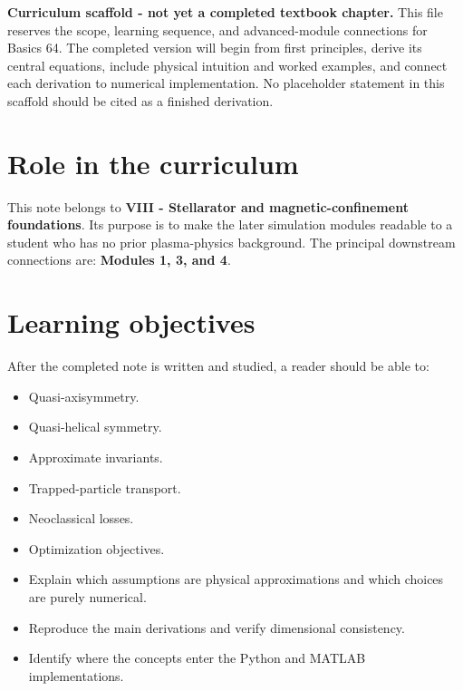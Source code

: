 \documentclass[11pt]{article}
\begin{document}

\begin{overviewbox}
\textbf{Curriculum scaffold - not yet a completed textbook chapter.} This file reserves the scope, learning sequence, and advanced-module connections for Basics 64. The completed version will begin from first principles, derive its central equations, include physical intuition and worked examples, and connect each derivation to numerical implementation. No placeholder statement in this scaffold should be cited as a finished derivation.
\end{overviewbox}

\ProjectTOC

\section{Role in the curriculum}
This note belongs to \textbf{VIII - Stellarator and magnetic-confinement foundations}. Its purpose is to make the later simulation modules readable to a student who has no prior plasma-physics background. The principal downstream connections are: \textbf{Modules 1, 3, and 4}.

\section{Learning objectives}
After the completed note is written and studied, a reader should be able to:
\begin{itemize}[leftmargin=1.6em]
\item Quasi-axisymmetry.
\item Quasi-helical symmetry.
\item Approximate invariants.
\item Trapped-particle transport.
\item Neoclassical losses.
\item Optimization objectives.
\item Explain which assumptions are physical approximations and which choices are purely numerical.
\item Reproduce the main derivations and verify dimensional consistency.
\item Identify where the concepts enter the Python and MATLAB implementations.
\end{itemize}
\end{document}

